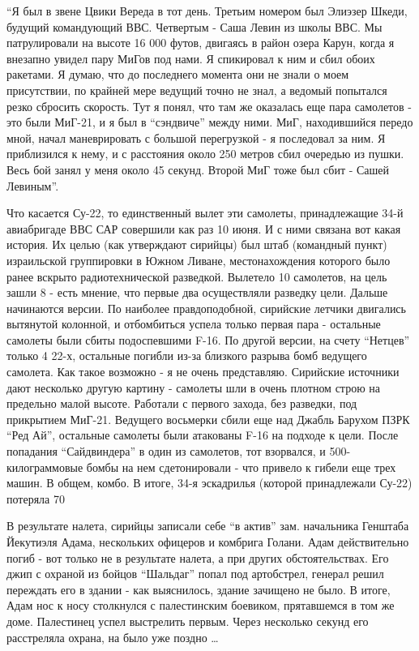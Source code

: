“Я был в звене Цвики Вереда в тот день. Третьим номером был Элиэзер Шкеди, будущий командующий ВВС. Четвертым - Саша Левин из школы ВВС. Мы патрулировали на высоте 16 000 футов, двигаясь в район озера Карун, когда я внезапно увидел пару МиГов под нами. Я спикировал к ним и сбил обоих ракетами. Я думаю, что до последнего момента они не знали о моем присутствии, по крайней мере ведущий точно не знал, а ведомый попытался резко сбросить скорость. Тут я понял, что там же оказалась еще пара самолетов - это были МиГ-21, и я был в “сэндвиче” между ними. МиГ, находившийся передо мной, начал маневрировать с большой перегрузкой - я последовал за ним. Я приблизился к нему, и с расстояния около 250 метров сбил очередью из пушки. Весь бой занял у меня около 45 секунд. Второй МиГ тоже был сбит - Сашей Левиным”.

Что касается Су-22, то единственный вылет эти самолеты, принадлежащие 34-й авиабригаде ВВС САР совершили как раз 10 июня. И с ними связана вот какая история. Их целью (как утверждают сирийцы) был штаб (командный пункт) израильской группировки в Южном Ливане, местонахождения которого было ранее вскрыто радиотехнической разведкой. Вылетело 10 самолетов, на цель зашли 8 - есть мнение, что первые два осуществляли разведку цели. Дальше начинаются версии. По наиболее правдоподобной, сирийские летчики двигались вытянутой колонной, и отбомбиться успела только первая пара - остальные самолеты были сбиты подоспевшими F-16. По другой версии, на счету “Нетцев” только 4 22-х, остальные погибли из-за близкого разрыва бомб ведущего самолета. Как такое возможно - я не очень представляю. Сирийские источники дают несколько другую картину - самолеты шли в очень плотном строю на предельно малой высоте. Работали с первого захода, без разведки, под прикрытием МиГ-21. Ведущего восьмерки сбили еще над Джабль Барухом ПЗРК “Ред Ай”, остальные самолеты были атакованы F-16 на подходе к цели. После попадания “Сайдвиндера” в один из самолетов, тот взорвался, и 500-килограммовые бомбы на нем сдетонировали - что привело к гибели еще трех машин. В общем, комбо. В итоге, 34-я эскадрилья (которой принадлежали Су-22) потеряла 70%

В результате налета, сирийцы записали себе “в актив” зам. начальника Генштаба Йекутиэля Адама, нескольких офицеров и комбрига Голани. Адам действительно погиб - вот только не в результате налета, а при других обстоятельствах. Его джип с охраной из бойцов “Шальдаг” попал под артобстрел, генерал решил переждать его в здании - как выяснилось, здание зачищено не было. В итоге, Адам нос к носу столкнулся с палестинским боевиком, прятавшемся в том же доме. Палестинец успел выстрелить первым. Через несколько секунд его расстреляла охрана, на было уже поздно …

